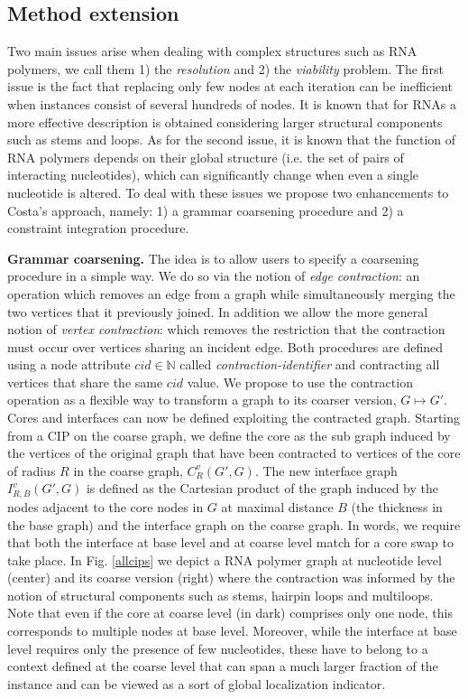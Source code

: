 \documentclass{article}
\newcommand*{\IN}[0]{\ensuremath{\mathbb{N}}}
\begin{document}
\subsection{Method extension}

Two main issues arise when dealing with complex structures such as RNA
polymers, we call them 1) the {\em resolution} and 2) the {\em viability}
problem. The first issue is the fact that replacing only few nodes at
each iteration can be inefficient when instances consist of several hundreds
of nodes. It is known that for RNAs a more effective description is obtained
considering larger structural components such as stems  and loops. As for the
second issue, it is known that the function of RNA polymers depends on their
global structure (i.e. the set of pairs of interacting nucleotides), which can
significantly change when even a single nucleotide is altered. To deal with
these issues we propose two enhancements to Costa's approach, namely: 1) a
grammar coarsening procedure and 2) a constraint integration procedure.


\textbf{Grammar coarsening.} The idea is to allow users to specify 
a coarsening procedure in a simple way. We do so via the notion of {\em edge
contraction}:
an operation which removes an edge from a graph while simultaneously merging
the two vertices that it previously joined. In addition we allow the more
general notion of {\em vertex contraction}: which removes the restriction that
the contraction must occur over vertices sharing an incident edge. Both
procedures are defined using a node attribute $cid \in \IN$ called {\em
contraction-identifier} and contracting all vertices that share the same $cid$
value. We propose to use the contraction operation as a flexible way to
transform a graph to its coarser version, $G \mapsto G'$. Cores and interfaces
can now be defined exploiting the contracted graph. Starting from a CIP on the
coarse graph, we define the core as the sub graph induced by the vertices of
the original graph that have been contracted to vertices of the core of radius
$R$ in the coarse graph, $C_R^v(G',G)$.  The new interface graph
$I_{R,B}^v(G',G)$ is defined as the Cartesian product of the graph induced by
the nodes adjacent to the core nodes in $G$ at maximal distance $B$ (the
thickness in the base graph) and the interface graph on the coarse graph. In
words, we require that both the interface at base level and at coarse level
match for a core swap to take place. In Fig. \ref{allcips}  we depict a RNA
polymer graph at nucleotide level (center) and its coarse version (right)
where the contraction was informed by the notion of structural components such
as stems, hairpin loops and multiloops. Note that even if the core at coarse
level (in dark) comprises only one node, this corresponds to multiple nodes at
base level. Moreover, while the interface at base level requires only the
presence of few nucleotides, these have to belong to a context defined at the
coarse level that can span a much larger fraction of the instance and can be
viewed as a sort of global localization indicator.
\end{document}
